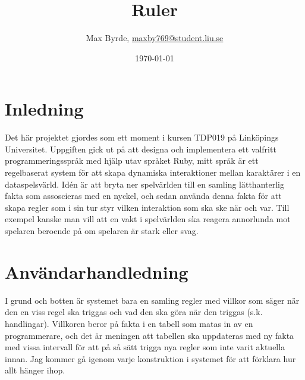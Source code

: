 \documentclass{TDP005mall}
\author{Max Byrde, \url{maxby769@student.liu.se}}
\title{Ruler}
\date{\today}
\begin{document}
\projectpage
\tableofcontents
\newpage
\section{Inledning}
Det här projektet gjordes som ett moment i kursen TDP019 på Linköpings Universitet.
Uppgiften gick ut på att designa och implementera ett valfritt
programmeringsspråk med hjälp utav språket Ruby, mitt språk är ett regelbaserat system
för att skapa dynamiska interaktioner mellan karaktärer i en dataspelsvärld.
Idén är att bryta ner spelvärlden till en samling lätthanterlig fakta som assoscieras
med en nyckel, och sedan använda denna fakta för att skapa regler som i sin tur styr
vilken interaktion som ska ske när och var. Till exempel kanske man vill att en vakt i
spelvärlden ska reagera annorlunda mot spelaren beroende på om spelaren är stark eller svag.

\section{Användarhandledning}
I grund och botten är systemet bara en samling regler med villkor som säger när den
en viss regel ska triggas och vad den ska göra när den triggas (s.k. handlingar). Villkoren
beror på fakta i en tabell som matas in av en programmerare, och det är meningen att tabellen
ska uppdateras med ny fakta med vissa intervall för att på så sätt trigga nya regler som inte varit aktuella
innan. Jag kommer gå igenom varje konstruktion i systemet för att förklara hur allt hänger ihop.
\end{document}
